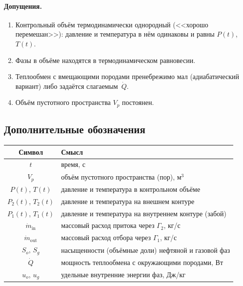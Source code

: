 \documentclass[12pt,a4paper]{article}
\begin{document}
\paragraph{Допущения.}
\begin{enumerate}[nosep]
  \item Контрольный объём термодинамически однородный (<<хорошо
        перемешан>>): давление и температура в нём одинаковы
        и равны $P(t)$, $T(t)$.
  \item Фазы в объёме находятся в термодинамическом равновесии.
  \item Теплообмен с вмещающими породами пренебрежимо мал (адиабатический
        вариант) либо задаётся слагаемым~$\dot{Q}$.
  \item Объём пустотного пространства $V_p$ постоянен.
\end{enumerate}

\subsection{Дополнительные обозначения}

\begin{center}
\renewcommand{\arraystretch}{1.25}
\begin{tabular}{cl}
  \hline
  Символ & Смысл \\
  \hline
  $t$                   & время, с \\
  $V_p$                 & объём пустотного пространства (пор), м$^3$ \\
  $P(t)$, $T(t)$        & давление и температура в контрольном объёме \\
  $P_2(t)$, $T_2(t)$    & давление и температура на внешнем контуре \\
  $P_1(t)$, $T_1(t)$    & давление и температура на внутреннем контуре (забой) \\
  $\dot{m}_{\text{in}}$ & массовый расход притока через $\Gamma_2$, кг/с \\
  $\dot{m}_{\text{out}}$& массовый расход отбора через $\Gamma_1$, кг/с \\
  $S_o$, $S_g$          & насыщенности (объёмные доли) нефтяной и газовой фаз \\
  $\dot{Q}$             & мощность теплообмена с окружающими породами, Вт \\
  $u_o$, $u_g$          & удельные внутренние энергии фаз, Дж/кг \\
  \hline
\end{tabular}
\end{center}
\end{document}
